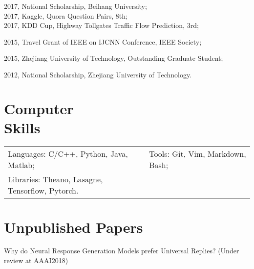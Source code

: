 \documentclass[margin,line]{resume}
\begin{document}
\begin{resume}
2017, National Scholarship, Beihang University;\\
2017, Kaggle, Quora Question Pairs, 8th; \\
2017, KDD Cup, Highway Tollgates Traffic Flow Prediction, 3rd;

2015, Travel Grant of IEEE on IJCNN Conference, IEEE Society;


2015, Zhejiang University of Technology, Outstanding Graduate Student;


2012, National Scholarship, Zhejiang University of Technology.




\section{Computer \\ Skills}
\begin{tabular}{@{}p{3.5in}p{4in}}
Languages: C/C++, Python, Java, Matlab;& Tools: Git, Vim, Markdown, Bash; \\
Libraries: Theano, Lasagne, Tensorflow, Pytorch.  &  \\
\end{tabular}


\section{Unpublished Papers}
Why do Neural Response Generation Models prefer Universal Replies? (Under review at AAAI2018)\\

\end{resume}
\end{document}
